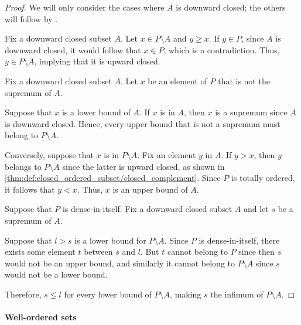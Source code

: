 \begin{proof}
  We will only consider the cases where \( A \) is downward closed; the others will follow by .

   Fix a downward closed subset \( A \). Let \( x \in P \setminus A \) and \( y \geq x \). If \( y \in P \), since \( A \) is downward closed, it would follow that \( x \in P \), which is a contradiction. Thus, \( y \in P \setminus A \), implying that it is upward closed.

   Fix a downward closed subset \( A \). Let \( x \) be an element of \( P \) that is not the supremum of \( A \).

  \SufficiencySubProof* Suppose that \( x \) is a lower bound of \( A \). If \( x \) is in \( A \), then \( x \) is a supremum since \( A \) is downward closed. Hence, every upper bound that is not a supremum must belong to \( P \setminus A \).

  \NecessitySubProof* Conversely, suppose that \( x \) is in \( P \setminus A \). Fix an element \( y \) in \( A \). If \( y > x \), then \( y \) belongs to \( P \setminus A \) since the latter is upward closed, as shown in \cref{thm:def:closed_ordered_subset/closed_complement}. Since \( P \) is totally ordered, it follows that \( y < x \). Thus, \( x \) is an upper bound of \( A \).

   Suppose that \( P \) is dense-in-itself. Fix a downward closed subset \( A \) and let \( s \) be a supremum of \( A \).

  Suppose that \( l > s \) is a lower bound for \( P \setminus A \). Since \( P \) is dense-in-itself, there exists some element \( t \) between \( s \) and \( l \). But \( t \) cannot belong to \( P \) since then \( s \) would not be an upper bound, and similarly it cannot belong to \( P \setminus A \) since \( s \) would not be a lower bound.

  Therefore, \( s \leq l \) for every lower bound of \( P \setminus A \), making \( s \) the infimum of \( P \setminus A \).
\end{proof}

\paragraph{Well-ordered sets}

